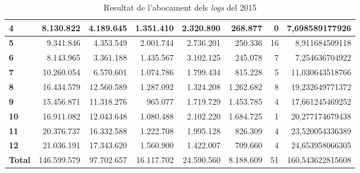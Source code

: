 \begin{table}[h!]
\begin{adjustbox}{width=1.5\textwidth, center}
\begin{tabular}{|l|r|r|r|r|r|r|r|}
            \textbf{4}     & 8.130.822   & 4.189.645  & 1.351.410  & 2.320.890  & 268.877   & 0  & 7,698589177926   \\
            \midrule
            \textbf{5}     & 9.341.846   & 4.353.549  & 2.001.744  & 2.736.201  & 250.336   & 16 & 8,911684509118   \\
            \textbf{6}     & 8.143.965   & 3.361.188  & 1.435.567  & 3.102.125  & 245.078   & 7  & 7,254636704922   \\
            \textbf{7}     & 10.260.054  & 6.570.601  & 1.074.786  & 1.799.434  & 815.228   & 5  & 11,030643518766  \\
            \textbf{8}     & 16.434.579  & 12.560.589 & 1.287.092  & 1.324.208  & 1.262.682 & 8  & 19,232649771372  \\
            \midrule
            \textbf{9}     & 15.456.871  & 11.318.276 & 965.077    & 1.719.729  & 1.453.785 & 4  & 17,661245469252  \\
            \textbf{10}    & 16.911.082  & 12.043.648 & 1.080.488  & 2.102.220  & 1.684.725 & 1  & 20,277174679438  \\
            \textbf{11}    & 20.376.737  & 16.332.588 & 1.222.708  & 1.995.128  & 826.309   & 4  & 23,520054336389  \\
            \textbf{12}    & 21.036.191  & 17.343.620 & 1.560.900  & 1.422.007  & 709.660   & 4  & 24,653958066305  \\
            \midrule
            \textbf{Total} & 146.599.579 & 97.702.657 & 16.117.702 & 24.590.560 & 8.188.609 & 51 & 160,543622815608 \\
            \bottomrule
        \end{tabular}
    \end{adjustbox}
    \caption{Resultat de l'abocament dels \textit{logs} del 2015}
    \label{tab:logs-table-2015}
\end{table}
